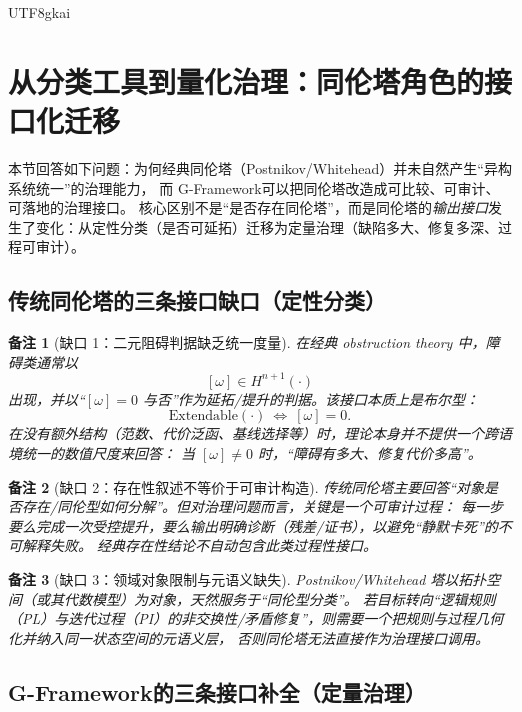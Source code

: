 \documentclass[12pt]{article}
\newtheorem{remark}{备注}[section]
\newcommand{\GFramework}{\textsf{G-Framework}}
\begin{document}
\begin{CJK*}{UTF8}{gkai}
\section{从分类工具到量化治理：同伦塔角色的接口化迁移}
\label{sec:qualitative-to-quantitative-governance}

本节回答如下问题：为何经典同伦塔（Postnikov/Whitehead）并未自然产生“异构系统统一”的治理能力，
而 \GFramework 可以把同伦塔改造成可比较、可审计、可落地的治理接口。
核心区别不是“是否存在同伦塔”，而是同伦塔的\emph{输出接口}发生了变化：从定性分类（是否可延拓）迁移为定量治理（缺陷多大、修复多深、过程可审计）。\cite{HomotopyMinimalityDialogue,HatcherAT}

\subsection{传统同伦塔的三条接口缺口（定性分类）}

\begin{remark}[缺口 1：二元阻碍判据缺乏统一度量]
在经典 obstruction theory 中，障碍类通常以
\[
  [\omega]\in H^{n+1}(\cdot)
\]
出现，并以“$[\omega]=0$ 与否”作为延拓/提升的判据。该接口本质上是布尔型：
\[
  \mathrm{Extendable}(\cdot)\ \Longleftrightarrow\ [\omega]=0.
\]
在没有额外结构（范数、代价泛函、基线选择等）时，理论本身并不提供一个跨语境统一的数值尺度来回答：
当 $[\omega]\neq 0$ 时，“障碍有多大、修复代价多高”。\cite{HatcherAT}
\end{remark}

\begin{remark}[缺口 2：存在性叙述不等价于可审计构造]
传统同伦塔主要回答“对象是否存在/同伦型如何分解”。但对治理问题而言，关键是一个\emph{可审计过程}：
每一步要么完成一次受控提升，要么输出明确诊断（残差/证书），以避免“静默卡死”的不可解释失败。
经典存在性结论不自动包含此类过程性接口。\cite{HomotopyMinimalityDialogue}
\end{remark}

\begin{remark}[缺口 3：领域对象限制与元语义缺失]
Postnikov/Whitehead 塔以拓扑空间（或其代数模型）为对象，天然服务于“同伦型分类”。
若目标转向“逻辑规则（PL）与迭代过程（PI）的非交换性/矛盾修复”，则需要一个把规则与过程几何化并纳入同一状态空间的元语义层，
否则同伦塔无法直接作为治理接口调用。\cite{HomotopyMinimalityDialogue}
\end{remark}

\subsection{\GFramework 的三条接口补全（定量治理）}


\end{CJK*}
\end{document}
